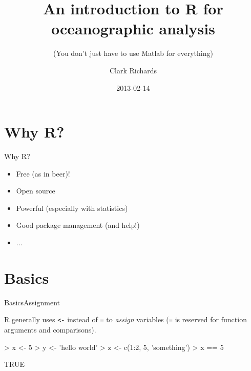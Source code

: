 \documentclass{beamer}
\title[POD] %
{An introduction to R for oceanographic analysis}
\subtitle
{(You don't just have to use Matlab for everything)}
\author[Richards]
{Clark Richards}
\date%
{2013-02-14}
\begin{document}
\begin{frame}
  \titlepage
\end{frame}



\section{Why R?}

\begin{frame}{Why R?}

  \begin{block}{}
    \begin{itemize}
    \item Free (as in beer)!
    \item Open source
    \item Powerful (especially with statistics)
    \item Good package management (and help!)
    \item ...
    \end{itemize}
  \end{block}

\end{frame}

\section{Basics}

\begin{frame}[fragile]{Basics}{Assignment}
  
  R generally uses \verb|<-| instead of \verb|=| to {\it assign}
  variables (\verb|=| is reserved for function arguments and comparisons).
\begin{Schunk}
\begin{Sinput}
> x <- 5
> y <- 'hello world'
> z <- c(1:2, 5, 'something')
> x == 5
\end{Sinput}
\begin{Soutput}
[1] TRUE
\end{Soutput}
\end{Schunk}
  
\end{frame}
\end{document}
